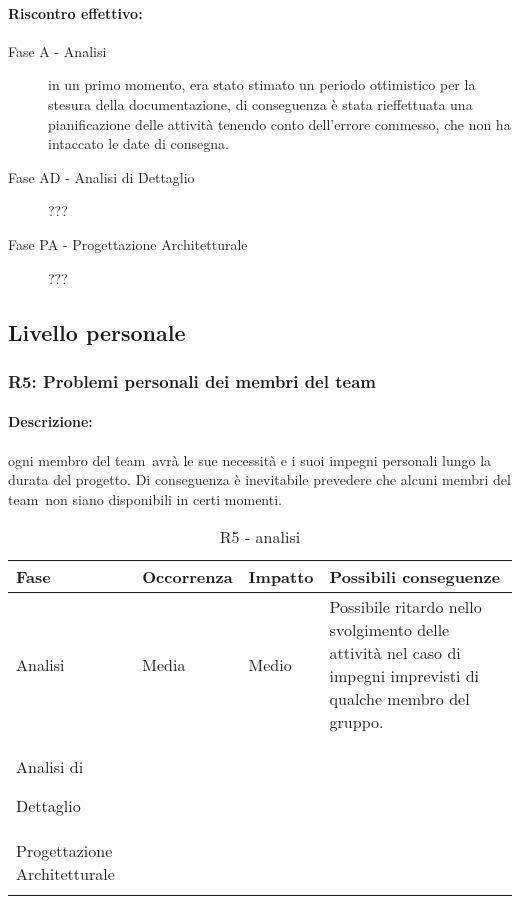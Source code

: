 \documentclass[../PianoProgetto.tex]{subfiles}
\begin{document}
	\paragraph*{Riscontro effettivo:} 
		\begin{description}
			\item[Fase A - Analisi] in un primo momento, era stato stimato un periodo ottimistico per la stesura della documentazione, di conseguenza è stata rieffettuata una pianificazione delle attività tenendo conto dell'errore commesso, che non ha intaccato le date di consegna.
			\item[Fase AD - Analisi di Dettaglio] ???
			\item[Fase PA - Progettazione Architetturale] ???
		\end{description}
		

\subsection{Livello personale}

\subsubsection{R5: Problemi personali dei membri del team}

	\paragraph*{Descrizione:} ogni membro del team\g\ avrà le sue necessità e i suoi impegni personali lungo la durata del progetto. Di conseguenza è inevitabile prevedere che alcuni membri del team\g\ non siano disponibili in certi momenti.
	 
	
	\begin{table}[h]
		\centering
		\begin{tabularx}{\textwidth}{F O O P}
			\toprule
			\textbf{Fase} & \textbf{Occorrenza} & \textbf{Impatto} & \textbf{Possibili conseguenze}\\
			\midrule
			Analisi & Media & Medio & Possibile ritardo nello svolgimento delle attività nel caso di impegni imprevisti di qualche membro del gruppo. \\
			\midrule
			Analisi di \par Dettaglio & & & \\
			\midrule
			Progettazione Architetturale & & & \\
			\bottomrule
		\end{tabularx}
		\caption{R5 - analisi}
		\label{tab:R5-analisi}	
	\end{table}
		
\end{document}
